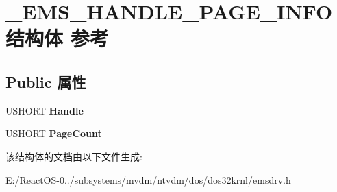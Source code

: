 \hypertarget{struct___e_m_s___h_a_n_d_l_e___p_a_g_e___i_n_f_o}{}\section{\+\_\+\+E\+M\+S\+\_\+\+H\+A\+N\+D\+L\+E\+\_\+\+P\+A\+G\+E\+\_\+\+I\+N\+F\+O结构体 参考}
\label{struct___e_m_s___h_a_n_d_l_e___p_a_g_e___i_n_f_o}
\subsection*{Public 属性}
\begin{DoxyCompactItemize}
\item 
\mbox{\label{struct___e_m_s___h_a_n_d_l_e___p_a_g_e___i_n_f_o_aded8ea4cda7450f940664dbfdfef737b}} 
U\+S\+H\+O\+RT {\bfseries Handle}
\item 
\mbox{\label{struct___e_m_s___h_a_n_d_l_e___p_a_g_e___i_n_f_o_a0fa81cd0a165e4e5fa41130af17e9277}} 
U\+S\+H\+O\+RT {\bfseries Page\+Count}
\end{DoxyCompactItemize}


该结构体的文档由以下文件生成\+:\begin{DoxyCompactItemize}
\item 
E\+:/\+React\+O\+S-\/0../subsystems/mvdm/ntvdm/dos/dos32krnl/emsdrv.\+h\end{DoxyCompactItemize}
